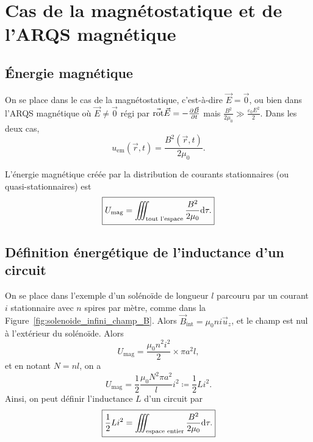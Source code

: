 \section{Cas de la magnétostatique et de l'ARQS magnétique}
\subsection{Énergie magnétique}

On se place dans le cas de la magnétostatique, c'est-à-dire $\vec{E}=\vec{0}$, ou bien dans l'ARQS magnétique où $\vec{E}\neq\vec{0}$ régi par $\vec{\mathrm{rot}}\vec{E}=-\frac{\partial\vec{B}}{\partial t}$ mais $\frac{B^{2}}{2\mu_0}\gg\frac{\varepsilon_0 E^{2}}{2}$. Dans les deux cas,
\begin{equation}
    \boxed{
        u_{\mathrm{em}}(\vec{r},t)=\frac{B^{2}(\vec{r},t)}{2\mu_0}.
    }
\end{equation}

L'énergie magnétique créée par la distribution de courants stationnaires (ou quasi-stationnaires) est
\begin{equation}
    \boxed{
        U_{\mathrm{mag}}=\iiint_{\text{tout l'espace}}\frac{B^{2}}{2\mu_0}\mathrm{d}\tau.
    }
\end{equation}

\subsection{Définition énergétique de l'inductance d'un circuit}

On se place dans l'exemple d'un solénoïde de longueur $l$ parcouru par un courant $i$ stationnaire avec $n$ spires par mètre, comme dans la Figure~\ref{fig:solenoide_infini_champ_B}. Alors $\vec{B}_{\mathrm{int}}=\mu_0 ni\vec{u}_z$, et le champ est nul à l'extérieur du solénoïde. Alors
\begin{equation}
    U_{\mathrm{mag}}=\frac{\mu_0 n^{2}i^{2}}{2}\times\pi a^{2}l,
\end{equation}
et en notant $N=nl$, on a 
\begin{equation}
    \boxed{
        U_{\mathrm{mag}}=\frac{1}{2}\frac{\mu_0 N^{2}\pi a^{2}}{l}i^{2}\coloneqq\frac{1}{2}Li^{2}.
    }
\end{equation}
Ainsi, on peut définir l'inductance $L$ d'un circuit par 
\begin{equation}
    \boxed{
        \frac{1}{2}Li^{2}=\iiint_{\text{espace entier}}\frac{B^{2}}{2\mu_0}\mathrm{d}\tau.
    }
\end{equation}